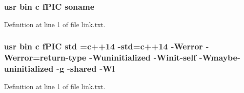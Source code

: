 \subsubsection[{\texorpdfstring{soname}{soname}}]{\setlength{\rightskip}{0pt plus 5cm}usr bin {\bf c} f\+P\+IC soname}\hypertarget{thirdparty_2extension_2CMakeFiles_2cpu__extension_8dir_2link_8txt_ab65a9b6457c4853ed17f89f945516e66}{}\label{thirdparty_2extension_2CMakeFiles_2cpu__extension_8dir_2link_8txt_ab65a9b6457c4853ed17f89f945516e66}


Definition at line 1 of file link.\+txt.

\subsubsection[{\texorpdfstring{std}{std}}]{\setlength{\rightskip}{0pt plus 5cm}usr bin {\bf c} f\+P\+IC std ={\bf c}++14 -\/std={\bf c}++14 -\/Werror -\/Werror=return-\/type -\/Wuninitialized -\/Winit-\/self -\/Wmaybe-\/uninitialized -\/g -\/shared -\/{\bf Wl}}\hypertarget{thirdparty_2extension_2CMakeFiles_2cpu__extension_8dir_2link_8txt_a5f87c8f8e33670f7c8c5221b6be1bcc4}{}\label{thirdparty_2extension_2CMakeFiles_2cpu__extension_8dir_2link_8txt_a5f87c8f8e33670f7c8c5221b6be1bcc4}


Definition at line 1 of file link.\+txt.

